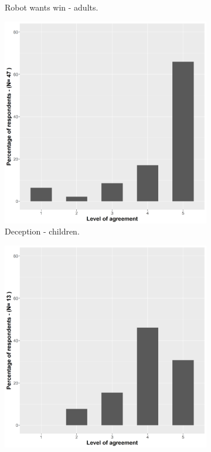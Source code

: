 \begin{figure}[t]
\begin{subfigure}[t]{0.49\columnwidth}
    \caption{Robot wants win - adults.}
    \label{fig::staticWinAdults}
  \end{subfigure}
  \begin{subfigure}[t]{0.49\columnwidth}
  \centering
    \includegraphics[width=\linewidth]{images/06-deception/staticDeceiveYoung}
    \caption{Deception - children.}
    \label{fig::staticDeceiveYoung}
  \end{subfigure} 
  \begin{subfigure}[t]{0.49\columnwidth}
  \centering
    \includegraphics[width=\linewidth]{images/06-deception/staticDeceiveAdults}

\end{subfigure}
\end{figure}
